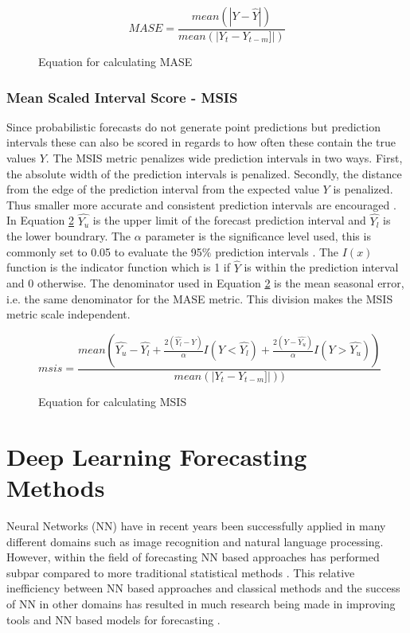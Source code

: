 \begin{figure}[h]
  \[MASE = \frac{mean(|Y - \hat{Y}|)}{mean(|Y_t - Y_{t-m}]|)}\]
  \caption{Equation for calculating MASE}
  \label{eq:MASE}
\end{figure}

\subsubsection{Mean Scaled Interval Score - MSIS}
\label{sec:msis}
Since probabilistic forecasts do not generate point predictions but prediction intervals these can also be scored in regards to how often these contain the true values \(Y\). The MSIS metric penalizes wide prediction intervals in two ways. First, the absolute width of the prediction intervals is penalized. Secondly, the distance from the edge of the prediction interval from the expected value \(Y\) is penalized. Thus smaller more accurate and consistent prediction intervals are encouraged \cite{makridakis_m4_2020}. In Equation \ref{eq:MSIS} \(\hat{Y_u}\) is the upper limit of the forecast prediction interval and \(\hat{Y_l}\) is the lower boundrary. The \(\alpha\) parameter is the significance level used, this is commonly set to 0.05 to evaluate the 95\% prediction intervals \cite{makridakis_m4_2020,gluonts-github}. The \(I(x)\) function is the indicator function which is 1 if \(\hat{Y}\) is within the prediction interval and 0 otherwise. The denominator used in Equation \ref{eq:MSIS} is the mean seasonal error, i.e. the same denominator for the MASE metric. This division makes the MSIS metric scale independent.

\begin{figure}[h]
  \[msis = \frac{mean(\hat{Y_u} - \hat{Y_l} + \frac{2(\hat{Y_l}-Y)}{\alpha}I(Y<\hat{Y_l}) + \frac{2(Y-\hat{Y_u})}{\alpha}I(Y>\hat{Y_u}))}{mean(|Y_t - Y_{t-m}]|))}\]
  \caption{Equation for calculating MSIS}
  \label{eq:MSIS}
\end{figure}

\section{Deep Learning Forecasting Methods}
\label{sec:deep_learning_methods}
Neural Networks (NN) have in recent years been successfully applied in many different domains such as image recognition and natural language processing. However, within the field of forecasting NN based approaches has performed subpar compared to more traditional statistical methods \cite{m3_competition,makridakis_m4_2020,oreshkin_n_beats_2020, other_thesis}. This relative inefficiency between NN based approaches and classical methods and the success of NN in other domains has resulted in much research being made in improving tools and NN based models for forecasting \cite{gluonts_paper}.

